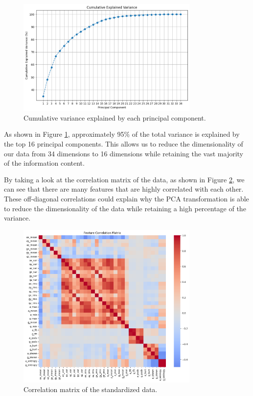 \documentclass[12pt]{article}
\begin{document}
\begin{figure}[H]
\centering
\includegraphics[width=0.8\textwidth]{figures/cum_var_scree.png}
\caption{Cumulative variance explained by each principal component.}
\label{fig:scree_plot}
\end{figure}

As shown in Figure \ref{fig:scree_plot}, approximately 95\% of the total variance is explained by the top 16 principal components. This allows us to reduce the dimensionality of our data from 34 dimensions to 16 dimensions while retaining the vast majority of the information content. 

\vspace{10pt}

By taking a look at the correlation matrix of the data, as shown in Figure \ref{fig:correlation_matrix}, we can see that there are many features that are highly correlated with each other. These off-diagonal correlations could explain why the PCA transformation is able to reduce the dimensionality of the data while retaining a high percentage of the variance.

\begin{figure}[H]
\centering
\includegraphics[width=0.8\textwidth]{figures/correlation_matrix.png}
\caption{Correlation matrix of the standardized data.}
\label{fig:correlation_matrix}
\end{figure}
\end{document}
